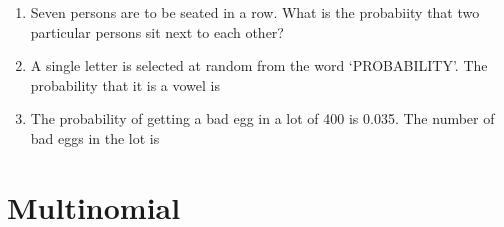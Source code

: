 \begin{enumerate}[label=\thesection.\arabic*,ref=\thesection.\theenumi]
\solution

\item Seven persons are to be seated in a row. What is the probabiity that two particular persons sit next to each other?\\
\solution

\item A single letter is selected at random from the word ‘PROBABILITY’. The
probability that it is a vowel is

\item The probability of getting a bad egg in a lot of 400 is 0.035. The number of bad eggs in the lot is\\
\solution

    \end{enumerate}
    \section{Multinomial}
